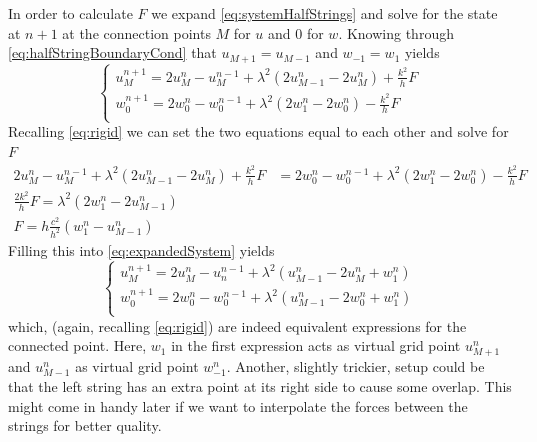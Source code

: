 \documentclass[dvipsnames]{article}
\begin{document}
In order to calculate $F$ we expand \eqref{eq:systemHalfStrings} and solve for the state at $n+1$ at the connection points $M$ for $u$ and $0$ for $w$. Knowing through \eqref{eq:halfStringBoundaryCond} that $u_{M+1} = u_{M-1}$ and $w_{-1} = w_1$   yields
\begin{equation}\label{eq:expandedSystem}
    \begin{cases}
    u^{n+1}_M = 2u_M^n - u_M^{n-1} + \lambda^2(2u_{M-1}^n-2u_M^n) + \frac{k^2}{h} F\\
    w^{n+1}_0 = 2w_0^n - w_0^{n-1} + \lambda^2(2w_1^n-2w_0^n) - \frac{k^2}{h} F\\
    \end{cases}
\end{equation}
Recalling \eqref{eq:rigid} we can set the two equations equal to each other and solve for $F$
\begin{align}
    2u_M^n - u_M^{n-1} + \lambda^2(2u_{M-1}^n-2u_M^n) + \frac{k^2}{h} F &=
    2w_0^n - w_0^{n-1} + \lambda^2(2w_1^n-2w_0^n) - \frac{k^2}{h} F\nonumber\\
    \frac{2k^2}{h}F = \lambda^2(2w_1^n - 2u_{M-1}^n)\nonumber\\
    F = h \frac{c^2}{h^2}(w_1^n - u_{M-1}^n)
\end{align}
Filling this into \eqref{eq:expandedSystem} yields
\begin{equation}
    \begin{cases}
    u^{n+1}_M = 2u_M^n - u_n^{n-1} + \lambda^2(u_{M-1}^n-2u_M^n+w_1^n)\\
    w^{n+1}_0 = 2w_0^n - w_0^{n-1} + \lambda^2(u_{M-1}^n-2w_0^n+w_1^n)\\
    \end{cases}
\end{equation}
which, (again, recalling \eqref{eq:rigid}) are indeed equivalent expressions for the connected point. Here, $w_1$ in the first expression acts as virtual grid point $u_{M+1}^n$ and $u_{M-1}^n$ as virtual grid point $w_{-1}^n$. 
Another, slightly trickier, setup could be that the left string has an extra point at its right side to cause some overlap. This might come in handy later if we want to interpolate the forces between the strings for better quality. 
\end{document}
